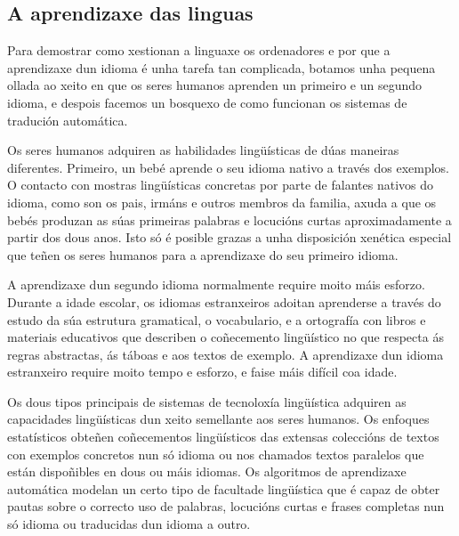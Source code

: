\begin{multicols}{2}

\subsection{A aprendizaxe das linguas}

   Para demostrar como xestionan a linguaxe os ordenadores e por que a aprendizaxe dun idioma é unha tarefa tan complicada, botamos unha pequena ollada ao xeito en que os seres humanos aprenden un primeiro e un segundo idioma, e despois facemos un bosquexo de como funcionan os sistemas de tradución automática.

Os seres humanos adquiren as habilidades lingüísticas de dúas maneiras diferentes. Primeiro, un bebé aprende o seu idioma nativo a través dos exemplos. O contacto con mostras lingüísticas concretas por parte de falantes nativos do idioma, como son os pais, irmáns e outros membros da familia, axuda a que os bebés produzan as súas primeiras palabras e locucións curtas aproximadamente a partir dos dous anos. Isto só é posible grazas a unha disposición xenética especial que teñen os seres humanos para a aprendizaxe do seu primeiro idioma. 

A aprendizaxe dun segundo idioma normalmente require moito máis esforzo. Durante a idade escolar, os idiomas estranxeiros adoitan aprenderse a través do estudo da súa estrutura gramatical, o vocabulario, e a ortografía con libros e materiais educativos que describen o coñecemento lingüístico no que respecta ás regras abstractas, ás táboas e aos textos de exemplo. A aprendizaxe dun idioma estranxeiro require moito tempo e esforzo, e faise máis difícil coa idade.


Os dous tipos principais de sistemas de tecnoloxía lingüística adquiren as capacidades lingüísticas dun xeito semellante aos seres humanos. Os enfoques estatísticos obteñen coñecementos lingüísticos das extensas coleccións de textos con exemplos concretos nun só idioma ou nos chamados textos paralelos que están dispoñibles en dous ou máis idiomas. Os algoritmos de aprendizaxe automática modelan un certo tipo de facultade lingüística que é capaz de obter pautas sobre o correcto uso de palabras, locucións curtas e frases completas nun só idioma ou traducidas dun idioma a outro. 


\end{multicols}
